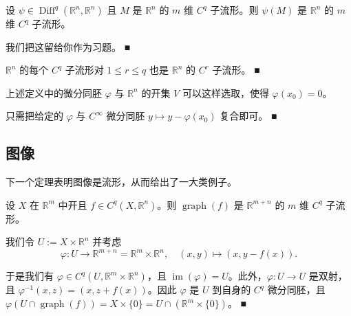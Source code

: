 \begin{example}
\begin{items}
设 $ \psi \in \operatorname{Diff}^{q}(\mathbb{R}^{n}, \mathbb{R}^{n}) $ 且 $ M $ 是 $ \mathbb{R}^{n} $ 的 $ m $ 维 $ C^{q} $ 子流形。则 $ \psi(M) $ 是 $ \mathbb{R}^{n} $ 的 $ m $ 维 $ C^{q} $ 子流形。

\proofhead
我们把这留给你作为习题。 \nobreak\hspace{0.35em}■
\item

$ \mathbb{R}^{n} $ 的每个 $ C^{q} $ 子流形对 $ 1 \le r \le q $ 也是 $ \mathbb{R}^{n} $ 的 $ C^{r} $ 子流形。 \nobreak\hspace{0.35em}■

\item

上述定义中的微分同胚 $ \varphi $ 与 $ \mathbb{R}^{n} $ 的开集 $ V $ 可以这样选取，使得 $ \varphi(x_{0}) = 0 $。

\proofhead
只需把给定的 $ \varphi $ 与 $ C^{\infty} $ 微分同胚 $ y \mapsto y - \varphi(x_{0}) $ 复合即可。 \nobreak\hspace{0.35em}■
\end{items}

\end{example}

\subsection*{图像}

下一个定理表明图像是流形，从而给出了一大类例子。

\begin{proposition}

设 $ X $ 在 $ \mathbb{R}^{m} $ 中开且 $ f \in C^{q}(X, \mathbb{R}^{n}) $。则 $ \operatorname{graph}(f) $ 是 $ \mathbb{R}^{m+n} $ 的 $ m $ 维 $ C^{q} $ 子流形。

\proofhead
我们令 $ U := X \times \mathbb{R}^{n} $ 并考虑
\[
\varphi : U \to \mathbb{R}^{m+n} = \mathbb{R}^{m} \times \mathbb{R}^{n} , \quad (x, y) \mapsto (x, y - f(x)) .
\]

于是我们有 $ \varphi \in C^{q}(U, \mathbb{R}^{m} \times \mathbb{R}^{n}) $，且 $ \operatorname{im}(\varphi) = U $。此外，$ \varphi : U \to U $ 是双射，且 $ \varphi^{-1}(x, z) = (x, z + f(x)) $。因此 $ \varphi $ 是 $ U $ 到自身的 $ C^{q} $ 微分同胚，且 $ \varphi(U \cap \operatorname{graph}(f)) = X \times \{0\} = U \cap (\mathbb{R}^{m} \times \{0\}) $。 \nobreak\hspace{0.35em}■

\end{proposition}

